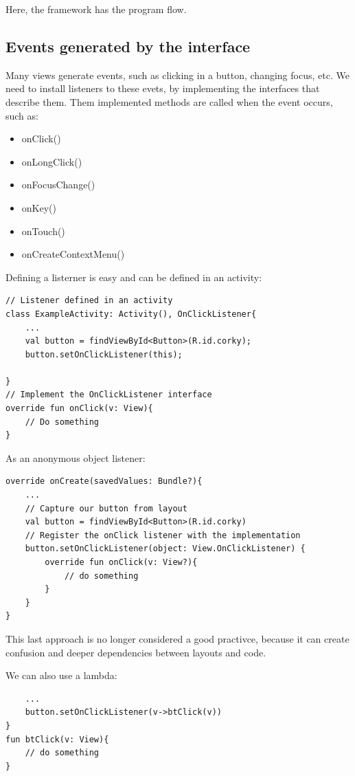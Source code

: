 Here, the framework has the program flow. 


\subsection{Events generated by the interface}
Many views generate events, such as clicking in a button, changing focus, etc.  
We need to install listeners to these evets, by implementing the interfaces that describe them. 
Them implemented methods are called when the event occurs, such as:

\begin{itemize}
    \item onClick()
    \item onLongClick()
    \item onFocusChange()
    \item onKey()
    \item onTouch()
    \item onCreateContextMenu()
\end{itemize}

Defining a listerner is easy and can be defined in an activity: 

\begin{lstlisting}
// Listener defined in an activity
class ExampleActivity: Activity(), OnClickListener{
    ...
    val button = findViewById<Button>(R.id.corky);
    button.setOnClickListener(this);

}
// Implement the OnClickListener interface
override fun onClick(v: View){
    // Do something
}
\end{lstlisting}

As an anonymous object listener:
\begin{lstlisting}
override onCreate(savedValues: Bundle?){
    ...
    // Capture our button from layout
    val button = findViewById<Button>(R.id.corky)
    // Register the onClick listener with the implementation
    button.setOnClickListener(object: View.OnClickListener) {
        override fun onClick(v: View?){
            // do something
        }
    }
}
\end{lstlisting}
This last approach is no longer considered a good practivce, because it can create 
confusion and deeper dependencies between layouts and code. 

We can also use a lambda:

\begin{lstlisting}
    ... 
    button.setOnClickListener(v->btClick(v))
} 
fun btClick(v: View){
    // do something
}
\end{lstlisting}


